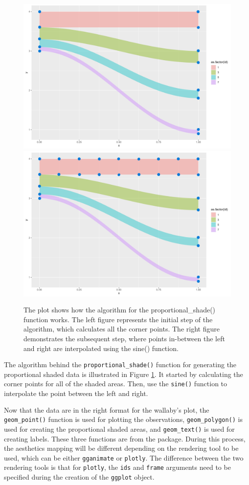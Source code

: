\begin{figure}
\includegraphics[width=0.5\linewidth]{figures/sankey-shade-1} \includegraphics[width=0.5\linewidth]{figures/sankey-shade-2} \caption{The plot shows how the algorithm for the proportional\_shade() function works. The left figure represents the initial step of the algorithm, which calculates all the corner points. The right figure demonstrates the subsequent step, where points in-between the left and right are interpolated using the sine() function.}\label{fig:shade-algorithm}
\end{figure}

The algorithm behind the \texttt{proportional\_shade()} function for generating the proportional shaded data is illustrated in Figure \ref{fig:shade-algorithm}. It started by calculating the corner points for all of the shaded areas. Then, use the \texttt{sine()} function to interpolate the point between the left and right.

Now that the data are in the right format for the wallaby's plot, the \texttt{geom\_point()} function is used for plotting the observations, \texttt{geom\_polygon()} is used for creating the proportional shaded areas, and \texttt{geom\_text()} is used for creating labels. These three functions are from the  package. During this process, the aesthetics mapping will be different depending on the rendering tool to be used, which can be either \texttt{gganimate} or \texttt{plotly}. The difference between the two rendering tools is that for \texttt{plotly}, the \texttt{ids} and \texttt{frame} arguments need to be specified during the creation of the \texttt{ggplot} object.

